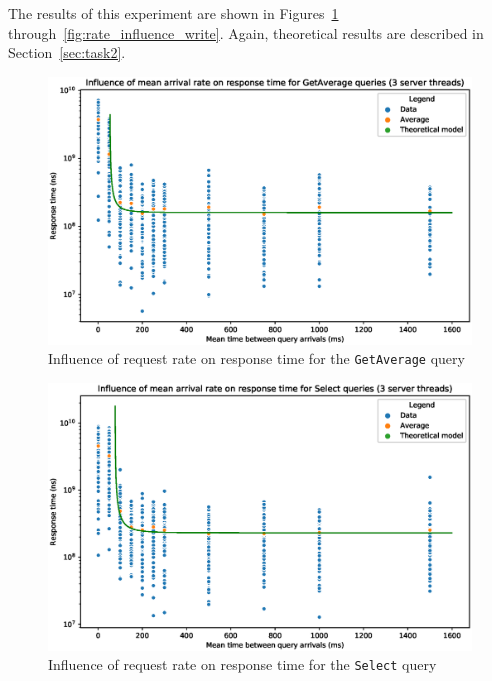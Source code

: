 \documentclass[journal]{IEEEtran}
\theoremstyle{definition}
\newcommand{\java}[1]{\texttt{#1}}
\begin{document}
The results of this experiment are shown in Figures~\ref{fig:rate_influence_average} through~\ref{fig:rate_influence_write}.
Again, theoretical results are described in Section~\ref{sec:task2}.
\begin{figure}[!hbtp]
	\centering
	\includegraphics[width=\columnwidth]{../plotting/rate_influence_average}
	\caption{Influence of request rate on response time for the \java{GetAverage} query}
	\label{fig:rate_influence_average}
\end{figure}
\begin{figure}[!hbtp]
	\centering
	\includegraphics[width=\columnwidth]{../plotting/rate_influence_select}
	\caption{Influence of request rate on response time for the \java{Select} query}
	\label{fig:rate_influence_select}
\end{figure}
\end{document}
